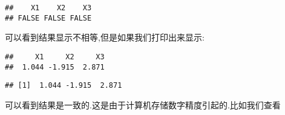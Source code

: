 \documentclass[]{ctexbook}
\newenvironment{Shaded}{\begin{snugshade}}{\end{snugshade}}
\newcommand{\DataTypeTok}[1]{\textcolor[rgb]{0.13,0.29,0.53}{#1}}
\newcommand{\DecValTok}[1]{\textcolor[rgb]{0.00,0.00,0.81}{#1}}
\newcommand{\KeywordTok}[1]{\textcolor[rgb]{0.13,0.29,0.53}{\textbf{#1}}}
\newcommand{\NormalTok}[1]{#1}
\newcommand{\OperatorTok}[1]{\textcolor[rgb]{0.81,0.36,0.00}{\textbf{#1}}}
\begin{document}
\begin{verbatim}
##    X1    X2    X3 
## FALSE FALSE FALSE
\end{verbatim}

可以看到结果显示不相等,但是如果我们打印出来显示:

\begin{Shaded}
\end{Shaded}

\begin{verbatim}
##     X1     X2     X3 
##  1.044 -1.915  2.871
\end{verbatim}

\begin{Shaded}
\end{Shaded}

\begin{verbatim}
## [1]  1.044 -1.915  2.871
\end{verbatim}

可以看到结果是一致的.这是由于计算机存储数字精度引起的.比如我们查看

\begin{Shaded}
\end{Shaded}
\end{document}
